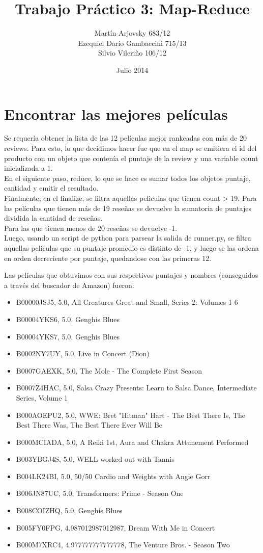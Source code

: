 \documentclass{article}
\title{Trabajo Pr\'actico 3: Map-Reduce}
\author{Mart\'{i}n Arjovsky 683/12 \\ Ezequiel Dar\'io Gambaccini 715/13 \\ Silvio Vileri\~no 106/12}
\date{Julio 2014}
\begin{document}
\maketitle

\section{Encontrar las mejores pel\'iculas}

 Se requer\'ia obtener la lista de las 12 pel\'iculas mejor rankeadas con m\'as de 20 reviews. Para esto, lo que decidimos hacer fue que en el map se emitiera el id del producto con un objeto que conten\'ia el puntaje de la review y una variable count inicializada a 1.
\\ En el siguiente paso, reduce, lo que se hace es sumar todos los objetos {puntaje, cantidad} y emitir el resultado.
\\ Finalmente, en el finalize, se filtra aquellas peliculas que tienen count > 19. Para las pel\'iculas que tienen m\'as de 19 rese\~nas se devuelve la sumatoria de puntajes dividida la cantidad de rese\~nas.
\\ Para las que tienen menos de 20 rese\~nas se devuelve -1.
\\ Luego, usando un script de python para parsear la salida de runner.py, se filtra aquellas peliculas que su puntaje promedio es distinto de -1, y luego se las ordena en orden decreciente por puntaje, quedandose con las primeras 12.

Las pel\'iculas que obtuvimos con sus respectivos puntajes y nombres (conseguidos a trav\'es del buscador de Amazon) fueron:

\begin{itemize}
\item B00000JSJ5, 5.0, All Creatures Great and Small, Series 2: Volumes 1-6
\item B00004YKS6, 5.0, Genghis Blues
\item B00004YKS7, 5.0, Genghis Blues
\item B0002NY7UY, 5.0, Live in Concert (Dion)
\item B0007GAEXK, 5.0, The Mole - The Complete First Season
\item B0007Z4HAC, 5.0, Salsa Crazy Presents: Learn to Salsa Dance, Intermediate Series, Volume 1
\item B000AOEPU2, 5.0, WWE: Bret "Hitman" Hart - The Best There Is, The Best There Was, The Best There Ever Will Be
\item B000MCIADA, 5.0, A Reiki 1st, Aura and Chakra Attunement Performed
\item B003YBGJ4S, 5.0, WELL worked out with Tannis
\item B004LK24BI, 5.0, 50/50 Cardio and Weights with Angie Gorr
\item B006JN87UC, 5.0, Transformers: Prime - Season One
\item B008COIZHQ, 5.0, Genghis Blues
\item B005FY0FPG, 4.987012987012987, Dream With Me in Concert
\item B000M7XRC4, 4.977777777777778, The Venture Bros. - Season Two
\end{itemize}
\end{document}
